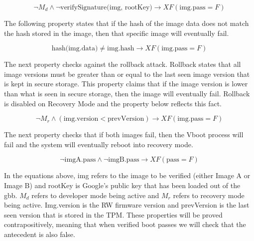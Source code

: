 \begin{equation} \label{eq:sig_cor}
 \lnot M_d \land \lnot \text{verifySignature(img, rootKey)} \to XF (\text{img.pass} = F)
\end{equation}

The following property states that if the hash of the image data does not match the hash stored in the image, then that specific image will eventually fail.

\begin{equation} \label{eq:hash_cor}
    \text{hash(img.data)} \neq \text{img.hash} \to XF (\text{img.pass} = F)
\end{equation}

The next property checks against the rollback attack. 
Rollback states that all image versions must be greater than or equal to the last seen image version that is kept in secure storage. 
This property claims that if the image version is lower than what is seen in secure storage, then the image will eventually fail.
Rollback is disabled on Recovery Mode and the property below reflects this fact.

\begin{equation} \label{eq:rollback}
    \lnot M_r \land (\text{img.version} < \text{prevVersion}) \to XF (\text{img.pass} = F)
\end{equation}

The next property checks that if both images fail, then the Vboot process will fail and the system will eventually reboot into recovery mode.

\begin{equation} \label{eq:both-fail}
    \lnot \text{imgA.pass} \land \lnot \text{imgB.pass} \to XF (\text{pass} = F)
\end{equation}



In the equations above, img refers to the image to be verified (either Image A or Image B)  and rootKey is Google's public key that has been loaded out of the gbb.
$M_d$ refers to developer mode being active and $M_r$ refers to recovery mode being active.
Img.version is the RW firmware version and prevVersion is the last seen version that is stored in the TPM\@.
These properties will be proved contrapositively, meaning that when verified boot passes we will check that the antecedent is also false.


